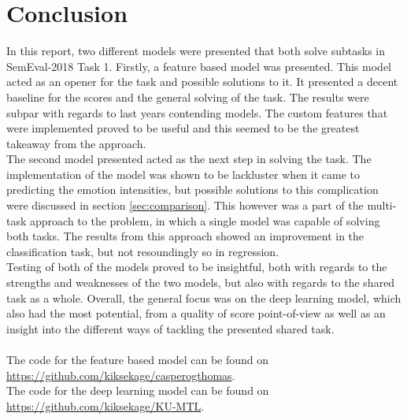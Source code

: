 
\section{Conclusion}
In this report, two different models were presented that both solve subtasks in SemEval-2018 Task 1. Firstly, a feature based model was presented. This model acted as an opener for the task and possible solutions to it. It presented a decent baseline for the scores and the general solving of the task. The results were subpar with regards to last years contending models. The custom features that were implemented proved to be useful and this seemed to be the greatest takeaway from the approach.\\
The second model presented acted as the next step in solving the task. The implementation of the model was shown to be lackluster when it came to predicting the emotion intensities, but possible solutions to this complication were discussed in section \ref{sec:comparison}. This however was a part of the multi-task approach to the problem, in which a single model was capable of solving both tasks. The results from this approach showed an improvement in the classification task, but not resoundingly so in regression.\\
Testing of both of the models proved to be insightful, both with regards to the strengths and weaknesses of the two models, but also with regards to the shared task as a whole. Overall, the general focus was on the deep learning model, which also had the most potential, from a quality of score point-of-view as well as an insight into the different ways of tackling the presented shared task.\\
\\
The code for the feature based model can be found on \href{https://github.com/kiksekage/casperogthomas}{https://github.com/kiksekage/casperogthomas}.\\
The code for the deep learning model can be found on \href{https://github.com/kiksekage/KU-MTL}{https://github.com/kiksekage/KU-MTL}.